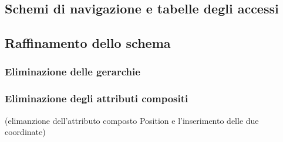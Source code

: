 \subsection{Schemi di navigazione e tabelle degli accessi}

\subsection{Raffinamento dello schema}
\subsubsection*{Eliminazione delle gerarchie}
\medskip

\subsubsection*{Eliminazione degli attributi compositi}
(elimanzione dell'attributo composto Position e l'inserimento delle due coordinate)

\medskip
